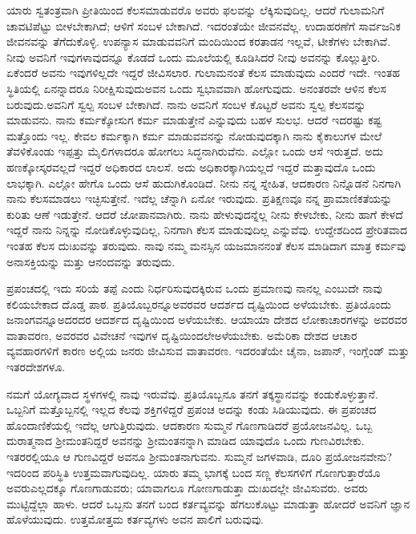 ಯಾರು ಸ್ವತಂತ್ರವಾಗಿ ಪ್ರೀತಿಯಿಂದ ಕೆಲಸಮಾಡುವರೊ ಅವರು ಫಲವನ್ನು ಲೆಕ್ಕಿಸುವುದಿಲ್ಲ. ಆದರೆ ಗುಲಾಮನಿಗೆ ಚಾವಟಿಪೆಟ್ಟು ಬೀಳಬೇಕಾಗಿದೆ; ಆಳಿಗೆ ಸಂಬಳ ಬೇಕಾಗಿದೆ. ಇದರಂತೆಯೇ ಜೀವನವೆಲ್ಲ. ಉದಾಹರಣೆಗೆ ಸಾರ್ವಜನಿಕ ಜೀವನವನ್ನು ತೆಗೆದುಕೊಳ್ಳಿ. ಉಪನ್ಯಾಸ ಮಾಡುವವನಿಗೆ ಮಂದಿಯಿಂದ ಕರತಾಡನ ಇಲ್ಲವೆ, ಟೀಕೆಗಳು ಬೇಕಾಗಿವೆ. ನೀವು ಅವನಿಗೆ ಇವುಗಳಾವುದನ್ನೂ ಕೊಡದೆ ಒಂದು ಮೂಲೆಯಲ್ಲಿ ಕೂಡಿಸಿದರೆ ನೀವು ಅವನನ್ನು ಕೊಲ್ಲುತ್ತೀರಿ. ಏಕೆಂದರೆ ಅವನು ಇವುಗಳಿಲ್ಲದೇ ಇದ್ದರೆ ಜೀವಿಸಲಾರ. ಗುಲಾಮನಂತೆ ಕೆಲಸ ಮಾಡುವುದು ಎಂದರೆ ಇದೇ. ಇಂತಹ ಸ್ಥಿತಿಯಲ್ಲಿ ಏನನ್ನಾದರೂ ನಿರೀಕ್ಷಿಸುವುದು\break ಅವನ ಒಂದು ಸ್ವಭಾವವಾಗಿ ಹೋಗುವುದು. ಅನಂತರವೇ ಆಳಿನ ಕೆಲಸ ಬರುವುದು.\break ಅವನಿಗೆ ಸ್ವಲ್ಪ ಸಂಬಳ ಬೇಕಾಗಿದೆ. ನಾನು ಅವನಿಗೆ ಸಂಬಳ ಕೊಟ್ಟರೆ ಅವನು ಸ್ವಲ್ಪ ಕೆಲಸವನ್ನು ಮಾಡುವನು. ನಾನು ಕರ್ಮಕ್ಕೋಸುಗ ಕರ್ಮ ಮಾಡುತ್ತೇನೆ ಎನ್ನುವುದು ಬಹಳ ಸುಲಭ. ಆದರೆ ಇದರಷ್ಟು ಕಷ್ಟ ಮತ್ತೊಂದು ಇಲ್ಲ. ಕೇವಲ ಕರ್ಮಕ್ಕಾಗಿ ಕರ್ಮ ಮಾಡುವವನನ್ನು ನೋಡುವುದಕ್ಕಾಗಿ ನಾನು ಕೈಕಾಲುಗಳ ಮೇಲೆ ತೆವಳಿಕೊಂಡು ಇಪ್ಪತ್ತು ಮೈಲಿಗಳಾದರೂ ಹೋಗಲು ಸಿದ್ಧನಾಗಿರುವೆನು. ಎಲ್ಲೋ ಒಂದು ಆಸೆ ಇರುತ್ತದೆ. ಅದು ಹಣಕ್ಕೋಸ್ಕರವಲ್ಲದೆ ಇದ್ದರೆ ಅಧಿಕಾರದ ಲಾಲಸೆ. ಅದು ಅಧಿಕಾರಕ್ಕಾಗಿಯಲ್ಲದೆ ಇದ್ದರೆ ಮತ್ತಾವುದೊ ಒಂದು ಲಾಭಕ್ಕಾಗಿ. ಎಲ್ಲೋ ಹೇಗೊ ಒಂದು ಆಸೆ ಹುದುಗಿಕೊಂಡಿದೆ. ನೀನು ನನ್ನ ಸ್ನೇಹಿತ, ಆದಕಾರಣ ನಿನ್ನೊಡನೆ ನಿನಗಾಗಿ ನಾನು ಕೆಲಸಮಾಡಲು ಇಚ್ಛಿಸುತ್ತೇನೆ. ಇದೆಲ್ಲ ಚೆನ್ನಾಗಿ ಏನೋ ಇರುವುದು. ಪ್ರತಿಕ್ಷಣವೂ ನನ್ನ ಪ್ರಾಮಾಣಿಕತೆಯನ್ನು ಕುರಿತು ಆಣೆ ಇಡುತ್ತೇನೆ. ಆದರೆ ಜೋಪಾನವಾಗಿರು. ನಾನು ಹೇಳುವುದನ್ನೆಲ್ಲ ನೀನು ಕೇಳಬೇಕು, ನೀನು ಹಾಗೆ ಕೇಳದೆ ಇದ್ದರೆ ನಾನು ನಿನ್ನನ್ನು ನೋಡಿಕೊಳ್ಳುವುದಿಲ್ಲ, ನಿನಗಾಗಿ ಕೆಲಸ ಮಾಡುವುದಿಲ್ಲ ಎನ್ನುವೆವು. ಉದ್ದೇಶದಿಂದ ಪ್ರೇರಿತವಾದ ಇಂತಹ ಕೆಲಸ ದುಃಖವನ್ನು ತರುವುದು. ನಾವು ನಮ್ಮ ಮನಸ್ಸಿನ ಯಜಮಾನನಂತೆ ಕೆಲಸ ಮಾಡಿದಾಗ ಮಾತ್ರ ಕರ್ಮವು ಅನಾಸಕ್ತಿಯನ್ನು ಮತ್ತು ಆನಂದವನ್ನು ತರುವುದು.

ಪ್ರಪಂಚದಲ್ಲಿ ಇದು ಸರಿಯೆ ತಪ್ಪೆ ಎಂದು ನಿರ್ಧರಿಸುವುದಕ್ಕಿರುವ ಒಂದು ಪ್ರಮಾ\-ಣವು ನಾನಲ್ಲ ಎಂಬುದೇ ನಾವು ಕಲಿಯಬೇಕಾದ ದೊಡ್ಡ ಪಾಠ. ಪ್ರತಿಯೊಬ್ಬರನ್ನೂ\break ಅವರವರ ಆದರ್ಶದ ದೃಷ್ಟಿಯಿಂದ ಅಳೆಯಬೇಕು. ಪ್ರತಿಯೊಂದು ಜನಾಂಗವನ್ನೂ\break ಅದರದರ ಆದರ್ಶದ ದೃಷ್ಟಿಯಿಂದ ಅಳೆಯಬೇಕು. ಆಯಾಯಾ ದೇಶದ ಲೋಕಾಚಾರಗಳನ್ನು ಅವರವರ ವಾತಾವರಣ, ಅವರವರ ವಿವೇಚನೆ ಇವುಗಳ ದೃಷ್ಟಿಯಿಂದಲೇ\break ಅಳೆಯಬೇಕು. ಅಮೆರಿಕಾ ದೇಶದ ಆಚಾರ ವ್ಯವಹಾರಗಳಿಗೆ ಕಾರಣ ಅಲ್ಲಿಯ ಜನರು ಜೀವಿಸುವ ವಾತಾವರಣ. ಇದರಂತೆಯೇ ಚೈನಾ, ಜಪಾನ್​, ಇಂಗ್ಲೆಂಡ್​ ಮತ್ತು ಇತರ\break ದೇಶಗಳೂ.

\vskip 3pt

ನಮಗೆ ಯೋಗ್ಯವಾದ ಸ್ಥಳಗಳಲ್ಲಿ ನಾವು ಇರುವೆವು. ಪ್ರತಿಯೊಬ್ಬನೂ ತನಗೆ ತಕ್ಕ\break ಸ್ಥಾನವನ್ನು ಕಂಡುಕೊಳ್ಳುತ್ತಾನೆ. ಒಬ್ಬನಿಗೆ ಮತ್ತೊಬ್ಬನಲ್ಲಿ ಇಲ್ಲದ ಕೆಲವು ಶಕ್ತಿಗಳಿದ್ದರೆ ಪ್ರಪಂಚ ಅದನ್ನು ಕಂಡು ಸಿಡಿಯುವುದು. ಈ ಪ್ರಪಂಚದ ಹೊಂದಾಣಿಕೆಯಲ್ಲಿ ಇದೆಲ್ಲ ಆಗುತ್ತಿರುವುದು. ಆದಕಾರಣ ಸುಮ್ಮನೆ ಗೊಣಗಾಡಿದರೆ ಪ್ರಯೋಜನವಿಲ್ಲ. ಒಬ್ಬ ದುರಾತ್ಮನಾದ ಶ‍್ರೀಮಂತನಿದ್ದರೆ ಅವನನ್ನು ಶ‍್ರೀಮಂತನನ್ನಾಗಿ ಮಾಡಿದ ಯಾವುದೊ ಒಂದು ಗುಣವಿರಬೇಕು. ಇತರರಲ್ಲಿಯೂ ಆ ಗುಣವಿದ್ದರೆ ಅವನೂ ಶ‍್ರೀಮಂತನಾಗುವನು. ಸುಮ್ಮನೆ ಜಗಳವಾಡಿ, ದೂರಿ ಪ್ರಯೋಜನವೇನು? ಇದರಿಂದ ಪರಿಸ್ಥಿತಿ ಉತ್ತಮವಾಗುವುದಿಲ್ಲ. ಯಾರು ತಮ್ಮ ಭಾಗಕ್ಕೆ ಬಂದ ಸಣ್ಣ ಕೆಲಸಗಳಿಗೆ ಗೊಣಗುತ್ತಾರೆಯೊ ಅವರು\break ಎಲ್ಲದಕ್ಕೂ ಗೊಣಗಾಡುವರು; ಯಾವಾಗಲೂ ಗೋಣಗಾಡುತ್ತಾ ದುಃಖದಲ್ಲೇ ಜೀವಿಸುವರು. ಅವರು ಮುಟ್ಟಿದ್ದೆಲ್ಲಾ ಹಾಳು. ಆದರೆ ಒಬ್ಬನು ತನಗೆ ಬಂದ ಕರ್ತವ್ಯವನ್ನು ಹೆಗಲುಕೊಟ್ಟು ಮಾಡುತ್ತಾ ಹೋದರೆ ಅವನಿಗೆ ಜ್ಞಾನ ಹೊಳೆಯುವುದು. ಉತ್ತಮೋತ್ತಮ ಕರ್ತವ್ಯಗಳು ಅವನ ಪಾಲಿಗೆ ಬರುವುವು.

\vspace{-0.6cm}

